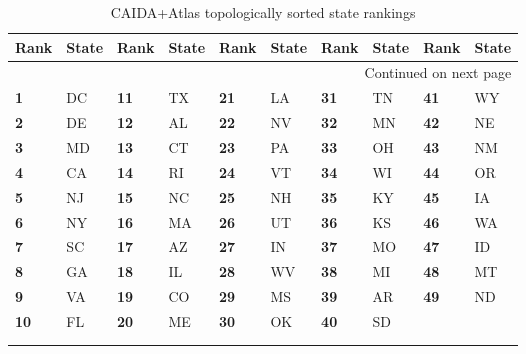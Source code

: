 \begin{longtable}{ll|ll|ll|ll|ll}
    \textbf{Rank} & \textbf{State} & \textbf{Rank} & \textbf{State} & \textbf{Rank} & \textbf{State} & \textbf{Rank} & \textbf{State} & \textbf{Rank} & \textbf{State} \\
    \midrule
    \endhead
    \midrule
    \multicolumn{10}{r}{{Continued on next page}} \\
    \endfoot
    \endlastfoot
    \textbf{1 } & DC & \textbf{11} & TX & \textbf{21} &  LA & \textbf{31} & TN & \textbf{41} &    WY \\
    \textbf{2 } & DE & \textbf{12} & AL & \textbf{22} &  NV & \textbf{32} & MN & \textbf{42} &    NE \\
    \textbf{3 } & MD & \textbf{13} & CT & \textbf{23} &  PA & \textbf{33} & OH & \textbf{43} &    NM \\
    \textbf{4 } & CA & \textbf{14} & RI & \textbf{24} &  VT & \textbf{34} & WI & \textbf{44} &    OR \\
    \textbf{5 } & NJ & \textbf{15} & NC & \textbf{25} &  NH & \textbf{35} & KY & \textbf{45} &    IA \\
    \textbf{6 } & NY & \textbf{16} & MA & \textbf{26} &  UT & \textbf{36} & KS & \textbf{46} &    WA \\
    \textbf{7 } & SC & \textbf{17} & AZ & \textbf{27} &  IN & \textbf{37} & MO & \textbf{47} &    ID \\
    \textbf{8 } & GA & \textbf{18} & IL & \textbf{28} &  WV & \textbf{38} & MI & \textbf{48} &    MT \\
    \textbf{9 } & VA & \textbf{19} & CO & \textbf{29} &  MS & \textbf{39} & AR & \textbf{49} &    ND \\
    \textbf{10} & FL & \textbf{20} & ME & \textbf{30} &  OK & \textbf{40} & SD &             &       \\
    \caption{CAIDA+Atlas topologically sorted state rankings}\\
    \label{tab:caida_topological_state_rankings}
\end{longtable}